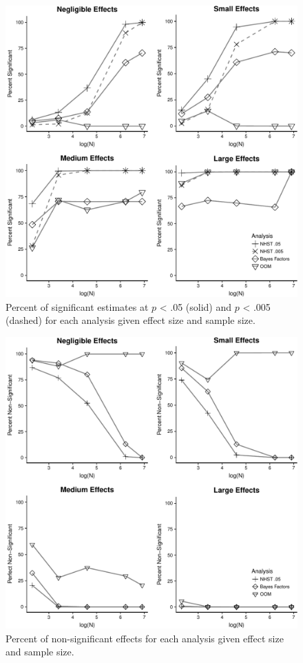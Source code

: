 \documentclass[english,man]{apa6}
\theoremstyle{definition}
\theoremstyle{definition}
\theoremstyle{definition}
\theoremstyle{remark}
\begin{document}
\begin{figure}
\centering
\includegraphics{alt_nhst_V2.kv.1.10_files/figure-latex/effects-graph-sig-1.pdf}
\caption{\label{fig:effects-graph-sig}Percent of significant estimates at
\(p\) \textless{} .05 (solid) and \(p\) \textless{} .005 (dashed) for
each analysis given effect size and sample size.}
\end{figure}

\begin{figure}
\centering
\includegraphics{alt_nhst_V2.kv.1.10_files/figure-latex/effects-graph-nonsig-1.pdf}
\caption{\label{fig:effects-graph-nonsig}Percent of non-significant effects
for each analysis given effect size and sample size.}
\end{figure}
\end{document}
